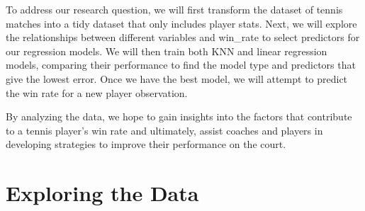 \documentclass[
]{article}
\begin{document}
To address our research question, we will first transform the dataset of tennis matches into a tidy dataset that only includes player stats. Next, we will explore the relationships between different variables and win\_rate to select predictors for our regression models. We will then train both KNN and linear regression models, comparing their performance to find the model type and predictors that give the lowest error. Once we have the best model, we will attempt to predict the win rate for a new player observation.

By analyzing the data, we hope to gain insights into the factors that contribute to a tennis player's win rate and ultimately, assist coaches and players in developing strategies to improve their performance on the court.

\hypertarget{exploring-the-data}{%
\section{Exploring the Data}\label{exploring-the-data}}
\end{document}
